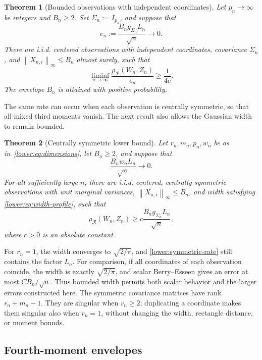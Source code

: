 \documentclass[11pt,letterpaper]{article}
\newenvironment{vSixBlock}{\color{magenta}}{}
\newtheorem{theorem}{Theorem}
\theoremstyle{remark}
\newcommand{\norm}[1]{\left\lVert#1\right\rVert}
\newcommand{\rh}{\rho_{\mathcal R}}
\begin{document}
\begin{vSixBlock}
\begin{theorem}[Bounded observations with independent coordinates]\label{opt:skew-lower}
Let \(p_n\to\infty\) be integers and \(B_n\ge2\). Set
\(\Sigma_n:=I_{p_n}\), and suppose that
\[
 e_n:=\frac{B_n g_{\Sigma_n}L_n}{\sqrt n}\longrightarrow0.
\]
There are i.i.d. centered observations with independent coordinates,
covariance \(\Sigma_n\), and \(\norm{X_{n,i}}_\infty\le B_n\)
almost surely, such that
\begin{equation}
 \liminf_{n\to\infty}\frac{\rh(W_n,Z_n)}{e_n}
 \ge\frac1{4e}.
 \label{opt:lower-constant}
\end{equation}
The envelope \(B_n\) is attained with positive probability.
\end{theorem}

The same rate can occur when each observation is centrally symmetric,
so that all mixed third moments vanish. The next result also allows
the Gaussian width to remain bounded.

\begin{theorem}[Centrally symmetric lower bound]\label{opt:symmetric-lower}
Let \(r_n,m_n,p_n,w_n\) be as in~\eqref{lower:eq:dimensions},
let \(B_n\ge2\), and suppose that
\[
 \frac{B_n w_nL_n}{\sqrt n}\longrightarrow0.
\]
For all sufficiently large \(n\), there are i.i.d. centered,
centrally symmetric observations with unit marginal variances,
\(\norm{X_{n,i}}_\infty\le B_n\), and width satisfying
\eqref{lower:eq:width-profile}, such that
\begin{equation}
 \rh(W_n,Z_n)\ge c\frac{B_n g_{\Sigma_n}L_n}{\sqrt n},
 \label{lower:symmetric-rate}
\end{equation}
where \(c>0\) is an absolute constant.
\end{theorem}

For \(r_n=1\), the width converges to \(\sqrt{2/\pi}\), and
\eqref{lower:symmetric-rate} still contains the factor \(L_n\).
For comparison, if all coordinates of each observation coincide,
the width is exactly \(\sqrt{2/\pi}\), and scalar Berry--Esseen
gives an error at most \(CB_n/\sqrt n\). Thus bounded width
permits both scalar behavior and the larger errors constructed here.
The symmetric covariance matrices have rank \(r_n+m_n-1\).
They are singular when \(r_n\ge2\); duplicating a coordinate
makes them singular also when \(r_n=1\), without changing the
width, rectangle distance, or moment bounds.

\subsection{Fourth-moment envelopes}\label{opt:q4-comparison}


\end{vSixBlock}
\end{document}
